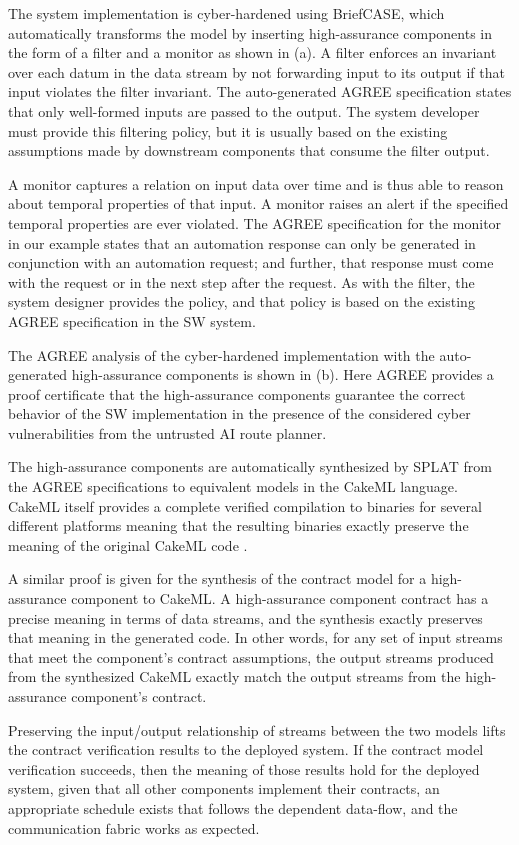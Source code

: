 The system implementation is cyber-hardened using BriefCASE, which automatically transforms the model by inserting high-assurance components in the form of a filter and a monitor as shown in (a). A filter enforces an invariant over each datum in the data stream by not forwarding input to its output if that input violates the filter invariant. The auto-generated AGREE specification states that only well-formed inputs are passed to the output. The system developer must provide this filtering policy, but it is usually based on the existing assumptions made by downstream components that consume the filter output. 

A monitor captures a relation on input data over time and is thus able to reason about temporal properties of that input. A monitor raises an alert if the specified temporal properties are ever violated. The AGREE specification for the monitor in our example states that an automation response can only be generated in conjunction with an automation request; and further,   that response must come with the request or in the next step after the request. As with the filter, the system designer provides the policy, and that policy is based on the existing AGREE specification in the SW system.

The AGREE analysis of the cyber-hardened implementation with the auto-generated high-assurance components is shown in (b). Here AGREE provides a proof certificate that the high-assurance components guarantee the correct behavior of the SW implementation in the presence of the considered cyber vulnerabilities from the untrusted AI route planner.

The high-assurance components are automatically synthesized by SPLAT from the AGREE specifications to equivalent models in the CakeML language. CakeML itself provides a complete verified compilation to binaries for several different platforms meaning that the resulting binaries exactly preserve the meaning of the original CakeML code \cite{cakeml}. 

A similar proof is given for the synthesis of the contract model for a high-assurance component to CakeML. A high-assurance component contract has a precise meaning in terms of data streams, and the synthesis exactly preserves that meaning in the generated code. In other words, for any set of input streams that meet the component's contract assumptions, the output streams produced from the synthesized CakeML exactly match the output streams from the high-assurance component's contract. 

Preserving the input/output relationship of streams between the two models lifts the contract verification results to the deployed system. If the contract model verification succeeds, then the meaning of those results hold for the deployed system, given that all other components implement their contracts, an appropriate schedule exists that follows the dependent data-flow, and the communication fabric works as expected.